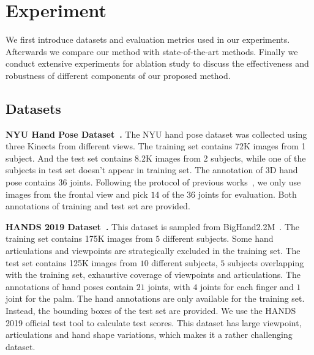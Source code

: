 \documentclass{article}
\begin{document}
\section{Experiment}
We first introduce datasets and evaluation metrics used in our experiments. Afterwards we compare our method with state-of-the-art methods. Finally we conduct extensive experiments for ablation study to discuss the effectiveness and robustness of different components of our proposed method.

\subsection{Datasets}\label{sec:datasets}

\par{\textbf{NYU Hand Pose Dataset~\cite{tompson2014real}.}}
The NYU hand pose dataset was collected using three Kinects from different views. The training set contains 72K images from 1 subject. And the test set contains 8.2K images from 2 subjects, while one of the subjects in test set doesn't appear in training set.
The annotation of 3D hand pose contains $36$ joints. Following the protocol of previous works~\cite{chen2019pose,guo2017region,moon2018v2v}, we only use images from the frontal view and pick $14$ of the $36$ joints for evaluation. Both annotations of training and test set are provided.

\par{\textbf{HANDS 2019 Dataset~\cite{hands2019}.}}
This dataset is sampled from BigHand2.2M~\cite{yuan2017bighand2}. The training set contains 175K images from $5$ different subjects. Some hand articulations and viewpoints are strategically excluded in the training set.
The test set contains 125K images from $10$ different subjects, $5$ subjects overlapping with the training set, exhaustive coverage of viewpoints and articulations. The annotations of hand poses contain $21$ joints, with $4$ joints for each finger and $1$ joint for the palm. The hand annotations are only available for the training set. Instead, the bounding boxes of the test set are provided. We use the HANDS 2019 official test tool to calculate test scores.
This dataset has large viewpoint, articulations and hand shape variations, which makes it a rather challenging dataset. 
\end{document}
